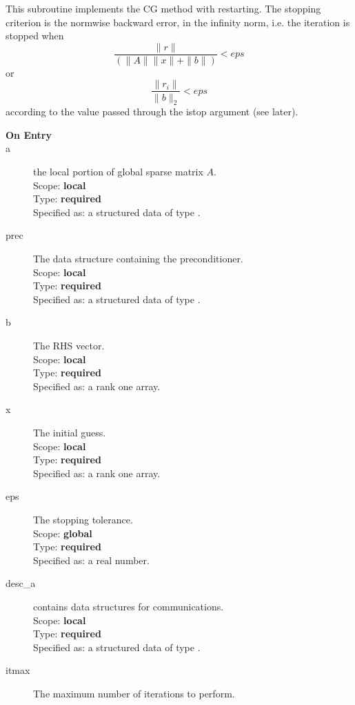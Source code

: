 
This subroutine implements the CG method with restarting. The
stopping criterion is the normwise backward error, in the infinity
norm, i.e. the iteration is stopped when 
\[ \frac{\|r\|}{(\|A\|\|x\|+\|b\|)} < eps \]
or
\[ \frac{\|r_i\|}{\|b\|_2} < eps \]
according to the value passed through the  istop argument (see later).



\begin{description}
\item[\bf On Entry]
\item[a] the local portion of global sparse matrix
$A$. \\
Scope: {\bf local} \\
Type: {\bf required}\\
Specified as: a structured data of type \spdata.
\item[prec] The data structure containing the preconditioner.\\
Scope: {\bf local} \\
Type: {\bf required}\\
Specified as: a structured data of type \precdata.
\item[b] The RHS vector. \\
Scope: {\bf local} \\
Type: {\bf required}\\
Specified as: a rank one array.
\item[x] The initial guess. \\
Scope: {\bf local} \\
Type: {\bf required}\\
Specified as: a rank one array.
\item[eps] The stopping tolerance. \\
Scope: {\bf global} \\
Type: {\bf required}\\
Specified as: a real number. 
\item[desc\_a] contains data structures for communications.\\
Scope: {\bf local} \\
Type: {\bf required}\\
Specified as: a structured data of type \descdata.
\item[itmax]  The maximum number of iterations to perform.\\

\end{description}

